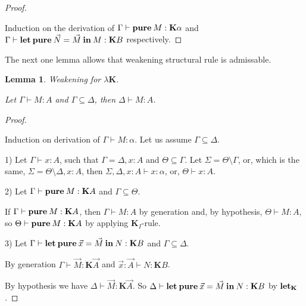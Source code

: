 \documentclass[a4paper]{article}
\newtheorem{lemma}{Lemma}
\begin{document}
  \begin{proof}

  $ $

Induction on the derivation of $\Gamma \vdash {\bf pure \: } M : \textbf{K}\alpha$ and $\Gamma \vdash {\bf let \: pure} \: \vec{N} = \vec{M} \: {\bf in} \: M : {\bf K} B$ respectively.
  \end{proof}

  \vspace{\baselineskip}

  The next one lemma allows that weakening structural rule is admissable.

  \begin{lemma} Weakening for $\lambda \textbf{K}$.

  Let $\Gamma \vdash M : A$ and $\Gamma \subseteq \Delta$, then $\Delta \vdash M : A$.

  \end{lemma}

  \begin{proof}

  $ $

  Induction on derivation of $\Gamma \vdash M : \alpha$. Let us assume $\Gamma \subseteq \Delta$.

  1) Let $\Gamma \vdash x : A$, such that $\Gamma = \Delta, x : A$ and $\Theta \subseteq \Gamma$.
  Let $\Sigma = \Theta \setminus \Gamma$, or, which is the same, $\Sigma = \Theta \setminus \Delta, x :
  A$, then $\Sigma, \Delta, x : A \vdash x : \alpha$, or, $\Theta \vdash x : A$.

  2) Let $\Gamma \vdash {\bf pure \: } M : \textbf{K}A$ and $\Gamma \subseteq \Theta$.

  If $\Gamma \vdash {\bf pure \: } M : \textbf{K}A$, then $\Gamma \vdash M : A$ by generation and, by
  hypothesis, $\Theta \vdash M : A$, so $\Theta \vdash {\bf pure \: } M : \textbf{K}A$ by applying
  $\textbf{K}_I$-rule.

  3) Let $\Gamma \vdash {\bf let \: pure \:} \vec{x} = \vec{M} {\bf \: in \:} N : \textbf{K}B$ and $\Gamma \subseteq \Delta$.

  By generation $\Gamma \vdash \vec{M} : \textbf{K}\vec{A}$ and $\vec{x} : \vec{A} \vdash N : \textbf{K}B$.

  By hypothesis we have $\Delta \vdash \vec{M} : \textbf{K}\vec{A}$. So $\Delta \vdash {\bf let \: pure \:} \vec{x} = \vec{M} {\bf \: in \:} N : \textbf{K}B$ by ${\bf let}_{\textbf{K}}$.

  \end{proof}
\end{document}
